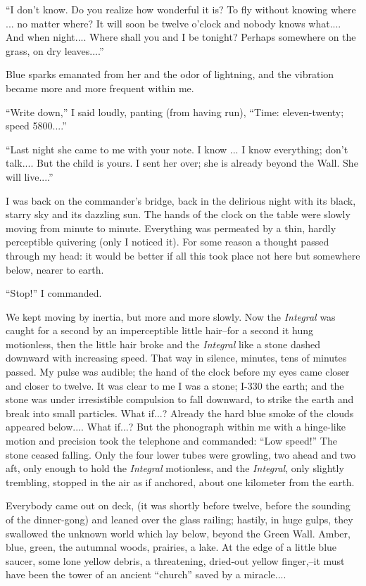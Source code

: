 \documentclass[11pt,openany]{book}
\begin{document}
``I don't know. Do you realize how wonderful it is? To fly without knowing where ... no matter where? It will soon be twelve o'clock and nobody knows what.... And when night.... Where shall you and I be tonight? Perhaps somewhere on the grass, on dry leaves....''

Blue sparks emanated from her and the odor of lightning, and the vibration became more and more frequent within me.

``Write down,'' I said loudly, panting (from having run), ``Time: eleven-twenty; speed 5800....''

``Last night she came to me with your note. I know ... I know everything; don't talk.... But the child is yours. I sent her over; she is already beyond the Wall. She will live....''

I was back on the commander's bridge, back in the delirious night with its black, starry sky and its dazzling sun. The hands of the clock on the table were slowly moving from minute to minute. Everything was permeated by a thin, hardly perceptible quivering (only I noticed it). For some reason a thought passed through my head: it would be better if all this took place not here but somewhere below, nearer to earth.

``Stop!'' I commanded.

We kept moving by inertia, but more and more slowly. Now the \emph{Integral} was caught for a second by an imperceptible little hair--for a second it hung motionless, then the little hair broke and the \emph{Integral} like a stone dashed downward with increasing speed. That way in silence, minutes, tens of minutes passed. My pulse was audible; the hand of the clock before my eyes came closer and closer to twelve. It was clear to me I was a stone; I-330 the earth; and the stone was under irresistible compulsion to fall downward, to strike the earth and break into small particles. What if...? Already the hard blue smoke of the clouds appeared below.... What if...? But the phonograph within me with a hinge-like motion and precision took the telephone and commanded: ``Low speed!'' The stone ceased falling. Only the four lower tubes were growling, two ahead and two aft, only enough to hold the \emph{Integral} motionless, and the \emph{Integral}, only slightly trembling, stopped in the air as if anchored, about one kilometer from the earth.

Everybody came out on deck, (it was shortly before twelve, before the sounding of the dinner-gong) and leaned over the glass railing; hastily, in huge gulps, they swallowed the unknown world which lay below, beyond the Green Wall. Amber, blue, green, the autumnal woods, prairies, a lake. At the edge of a little blue saucer, some lone yellow debris, a threatening, dried-out yellow finger,--it must have been the tower of an ancient ``church'' saved by a miracle....
\end{document}
